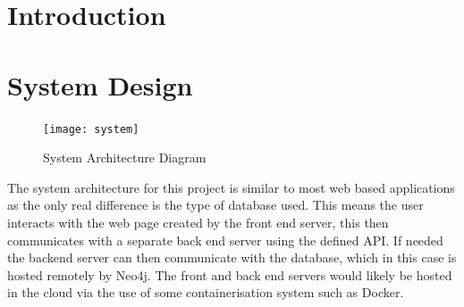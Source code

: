 \section{Introduction}
\section{System Design}
\begin{figure}[h]
    \centering
    \texttt{[image: system]}
    \caption{System Architecture Diagram}
\end{figure}
The system architecture for this project is similar to most web based applications as the only real difference is the type of database used.
This means the user interacts with the web page created by the front end server, this then communicates with a separate back end server 
using the defined API. If needed the backend server can then communicate with the database, which in this case is hosted 
remotely by Neo4j.
The front and back end servers would likely be hosted in the cloud via the use of some containerisation system such as Docker.
